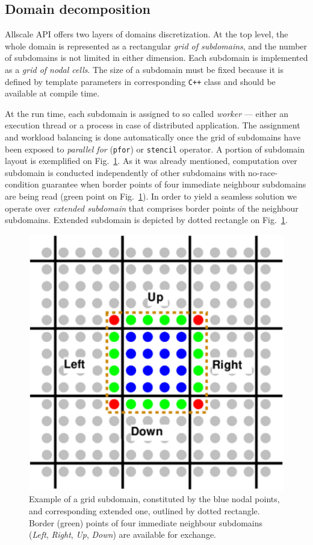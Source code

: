 \documentclass[acmsmall,review,anonymous]{acmart}\settopmatter{printfolios=true,printccs=false,printacmref=false}
\begin{document}
\subsection{Domain decomposition}

Allscale API offers two layers of domains discretization. At the top level, the whole domain is represented as a rectangular \textit{grid of subdomains}, and the number of subdomains is not limited in either dimension. Each subdomain is implemented as a \textit{grid of nodal cells}. The size of a subdomain must be fixed because it is defined by template parameters in corresponding \texttt{C++} class and should be available at compile time.

At the run time, each subdomain is assigned to so called \textit{worker} --- either an execution thread or a process in case of distributed application. The assignment and workload balancing is done automatically once the grid of subdomains have been exposed to \textit{parallel for} (\texttt{pfor}) or \texttt{stencil} operator. A portion of subdomain layout is exemplified on Fig.~\ref{fig:cell}. As it was already mentioned, computation over subdomain is conducted independently of other subdomains with no-race-condition guarantee when border points of four immediate neighbour subdomains are being read (green point on Fig.~\ref{fig:cell}). In order to yield a seamless solution we operate over \textit{extended subdomain} that comprises border points of the neighbour subdomains. Extended subdomain is depicted by dotted rectangle on Fig.~\ref{fig:cell}. 

\begin{figure}[!htb]
\includegraphics[scale=0.33]{images/subdomain}
\caption{Example of a grid subdomain, constituted by the blue nodal points, and corresponding extended one, outlined by dotted rectangle. Border (green) points of four immediate neighbour subdomains (\textit{Left}, \textit{Right}, \textit{Up}, \textit{Down}) are available for exchange.}
\label{fig:cell}
\end{figure}
\end{document}
